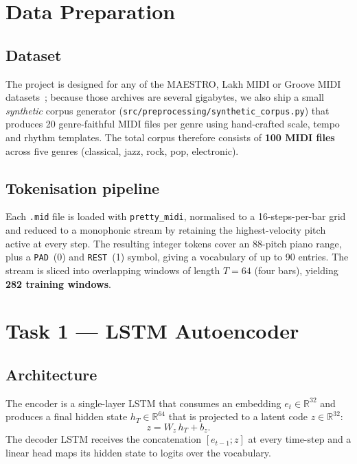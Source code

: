 \documentclass[conference]{IEEEtran}
\begin{document}
\section{Data Preparation}

\subsection{Dataset}
The project is designed for any of the MAESTRO, Lakh MIDI or Groove MIDI
datasets~\cite{maestro,lakh,groove}; because those archives are several
gigabytes, we also ship a small \emph{synthetic} corpus generator
(\texttt{src/preprocessing/synthetic\_corpus.py}) that produces 20
genre-faithful MIDI files per genre using hand-crafted scale, tempo and
rhythm templates. The total corpus therefore consists of
\textbf{100 MIDI files} across five genres (classical, jazz, rock, pop,
electronic).

\subsection{Tokenisation pipeline}
Each \texttt{.mid} file is loaded with \texttt{pretty\_midi}, normalised to a
16-steps-per-bar grid and reduced to a monophonic stream by retaining the
highest-velocity pitch active at every step. The resulting integer tokens
cover an 88-pitch piano range, plus a \texttt{PAD}~(0) and \texttt{REST}~(1)
symbol, giving a vocabulary of up to 90 entries. The stream is sliced into
overlapping windows of length $T\!=\!64$ (four bars), yielding
\textbf{282 training windows}.

\section{Task 1 --- LSTM Autoencoder}

\subsection{Architecture}
The encoder is a single-layer LSTM that consumes an embedding $e_t \in
\mathbb{R}^{32}$ and produces a final hidden state $h_T \in \mathbb{R}^{64}$
that is projected to a latent code $z \in \mathbb{R}^{32}$:
\[
z = W_z \, h_T + b_z.
\]
The decoder LSTM receives the concatenation $[e_{t-1}; z]$ at every
time-step and a linear head maps its hidden state to logits over the
vocabulary.
\end{document}
